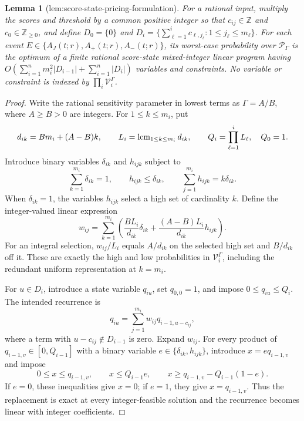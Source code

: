 \documentclass{article}
\newtheorem{lemma}{Lemma}
\begin{document}
\begin{lemma}[lem:score-state-pricing-formulation]\label{lem:score-state-pricing-formulation}
For a rational input, multiply the scores and threshold by a common positive integer so that \(c_{ij}\in\mathbb Z\) and \(c_0\in\mathbb Z_{\ge0}\), and define \(D_0=\{0\}\) and \(D_i=\{\sum_{\ell=1}^i c_{\ell,j_\ell}:1\le j_\ell\le m_\ell\}\). For each event \(E\in\{A_J(t;r),A_+(t;r),A_-(t;r)\}\), its worst-case probability over \(\mathcal P_\Gamma\) is the optimum of a finite rational score-state mixed-integer linear program having \(O(\sum_{i=1}^n m_i^2|D_{i-1}|+\sum_{i=1}^n|D_i|)\) variables and constraints. No variable or constraint is indexed by \(\prod_i\mathcal V_i^\Gamma\).
\end{lemma}
\begin{proof}
Write the rational sensitivity parameter in lowest terms as \(\Gamma=A/B\), where \(A\ge B>0\) are integers. For \(1\le k\le m_i\), put
\[
\makebox[\linewidth][c]{\resizebox{0.98\linewidth}{!}{\par\noindent \makebox[\linewidth][c]{\resizebox{0.98\linewidth}{!}{\(\displaystyle \displaystyle d_{ik}=Bm_i+(A-B)k,\qquad L_i=\operatorname{lcm}_{1\le k\le m_i}d_{ik},\qquad Q_i=\prod_{\ell=1}^iL_\ell,\quad Q_0=1.\)}}\par\noindent}}
\]
Introduce binary variables \(\delta_{ik}\) and \(h_{ijk}\) subject to
\[\sum_{k=1}^{m_i}\delta_{ik}=1,\qquad h_{ijk}\le\delta_{ik},\qquad \sum_{j=1}^{m_i}h_{ijk}=k\delta_{ik}.\]
When \(\delta_{ik}=1\), the variables \(h_{ijk}\) select a high set of cardinality \(k\). Define the integer-valued linear expression
\[w_{ij}=\sum_{k=1}^{m_i}\left(\frac{BL_i}{d_{ik}}\delta_{ik}+\frac{(A-B)L_i}{d_{ik}}h_{ijk}\right).\]
For an integral selection, \(w_{ij}/L_i\) equals \(A/d_{ik}\) on the selected high set and \(B/d_{ik}\) off it. These are exactly the high and low probabilities in \(\mathcal V_i^\Gamma\), including the redundant uniform representation at \(k=m_i\).

For \(u\in D_i\), introduce a state variable \(q_{iu}\), set \(q_{0,0}=1\), and impose \(0\le q_{iu}\le Q_i\). The intended recurrence is
\[q_{iu}=\sum_{j=1}^{m_i}w_{ij}q_{i-1,u-c_{ij}},\]
where a term with \(u-c_{ij}\notin D_{i-1}\) is zero. Expand \(w_{ij}\). For every product of \(q_{i-1,v}\in[0,Q_{i-1}]\) with a binary variable \(e\in\{\delta_{ik},h_{ijk}\}\), introduce \(x=e q_{i-1,v}\) and impose
\[0\le x\le q_{i-1,v},\qquad x\le Q_{i-1}e,\qquad x\ge q_{i-1,v}-Q_{i-1}(1-e).\]
If \(e=0\), these inequalities give \(x=0\); if \(e=1\), they give \(x=q_{i-1,v}\). Thus the replacement is exact at every integer-feasible solution and the recurrence becomes linear with integer coefficients.


\end{proof}
\end{document}
